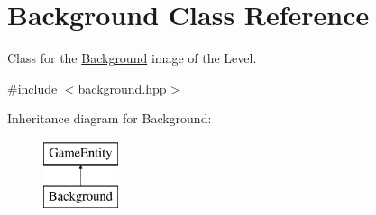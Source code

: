 \hypertarget{class_background}{}\section{Background Class Reference}
\label{class_background}


Class for the \mbox{\hyperlink{class_background}{Background}} image of the Level.  




{\ttfamily \#include $<$background.\+hpp$>$}

Inheritance diagram for Background\+:\begin{figure}[H]
\begin{center}
\leavevmode
\includegraphics[height=2.000000cm]{class_background}
\end{center}
\end{figure}
